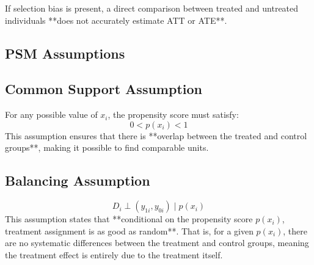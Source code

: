 \documentclass[10pt, oneside]{article}
\begin{document}
If selection bias is present, a direct comparison between treated and untreated individuals **does not accurately estimate ATT or ATE**.

\subsection{PSM Assumptions}

\subsection{Common Support Assumption}
For any possible value of $x_i$, the propensity score must satisfy:
\begin{equation}
0 < p(x_i) < 1
\end{equation}
This assumption ensures that there is **overlap between the treated and control groups**, making it possible to find comparable units.

\subsection{Balancing Assumption}
\begin{equation}
D_i \perp (y_{1i}, y_{0i}) \mid p(x_i)
\end{equation}
This assumption states that **conditional on the propensity score $p(x_i)$, treatment assignment is as good as random**. That is, for a given $p(x_i)$, there are no systematic differences between the treatment and control groups, meaning the treatment effect is entirely due to the treatment itself.
\end{document}
